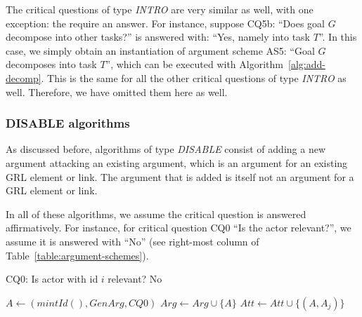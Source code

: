 The critical questions of type \emph{INTRO} are very similar as well, with one exception: the require an answer. For instance, suppose CQ5b: ``Does goal $G$ decompose into other tasks?'' is answered with: ``Yes, namely into task $T$''. In this case, we simply obtain an instantiation of argument scheme AS5: ``Goal $G$ decomposes into task $T$'', which can be executed with Algorithm~\ref{alg:add-decomp}. This is the same for all the other critical questions of type \emph{INTRO} as well. Therefore, we have omitted them here as well.

\subsubsection{DISABLE algorithms}

As discussed before, algorithms of type \emph{DISABLE} consist of adding a new argument attacking an existing argument, which is an argument for an existing GRL element or link. The argument that is added is itself not an argument for a GRL element or link.

In all of these algorithms, we assume the critical question is answered affirmatively. For instance, for critical question CQ0 ``Is the actor relevant?'', we assume it is answered with ``No'' (see right-most column of Table~\ref{table:argument-schemes}).

\begin{algorithm}[h]
  \caption{CQ0: Is actor with id $i$ relevant? No}\label{alg:actor-not-relevant}
  \begin{algorithmic}[1]
    \State $A \leftarrow (mintId(),GenArg,CQ0)$\label{alg:actor-not-relevant:genarg}
    \State $Arg\leftarrow Arg \cup \{A\}$\label{alg:actor-not-relevant:genarg2}
    \label{alg:actor-not-relevant:for}
      \State $Att \leftarrow Att \cup \{(A,A_j)\}$\label{alg:actor-not-relevant:att}
    \EndFor
    \EndProcedure
  \end{algorithmic}
\end{algorithm}

